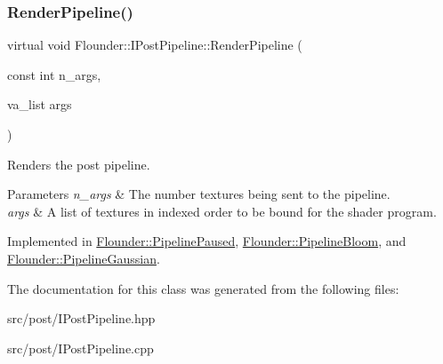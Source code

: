 \subsubsection{\texorpdfstring{Render\+Pipeline()}{RenderPipeline()}\hspace{0.1cm}{\footnotesize\ttfamily [2/2]}}
{\footnotesize\ttfamily virtual void Flounder\+::\+I\+Post\+Pipeline\+::\+Render\+Pipeline (\begin{DoxyParamCaption}\item[{const int}]{n\+\_\+args,  }\item[{va\+\_\+list}]{args }\end{DoxyParamCaption})\hspace{0.3cm}{\ttfamily [pure virtual]}}



Renders the post pipeline. 


\begin{DoxyParams}{Parameters}
{\em n\+\_\+args} & The number textures being sent to the pipeline. \\
\hline
{\em args} & A list of textures in indexed order to be bound for the shader program. \\
\hline
\end{DoxyParams}


Implemented in \hyperlink{class_flounder_1_1_pipeline_paused_a7cb1dcc1e1321e725e4292d305bfacc3}{Flounder\+::\+Pipeline\+Paused}, \hyperlink{class_flounder_1_1_pipeline_bloom_a2bff537e219a74540c1bda4c31fb4354}{Flounder\+::\+Pipeline\+Bloom}, and \hyperlink{class_flounder_1_1_pipeline_gaussian_a5187cbc15a4a56cef0ca227628a0f83f}{Flounder\+::\+Pipeline\+Gaussian}.



The documentation for this class was generated from the following files\+:\begin{DoxyCompactItemize}
\item 
src/post/I\+Post\+Pipeline.\+hpp\item 
src/post/I\+Post\+Pipeline.\+cpp\end{DoxyCompactItemize}
